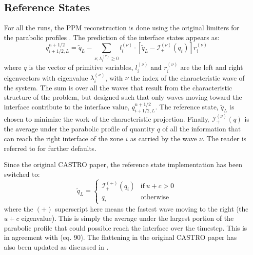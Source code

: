 \documentclass{emulateapj}
\begin{document}
\subsection{Reference States}

For all the runs, the PPM reconstruction is done using the original limiters for
the parabolic profiles \citep{ppm}.  The prediction of the interface
states appears as:
\begin{equation}
\label{eq:ppmstatel}
q_{i+1/2,L}^{n+1/2} = \tilde{q}_L -
   \sum_{\nu;\lambda_i^{(\nu)}\ge 0} l_i^{(\nu)} \cdot \left [
        \tilde{q}_L  - \mathcal{I}^{(\nu)}_+(q_i)
       \right ] r_i^{(\nu)}
\end{equation}
where $q$ is the vector of primitive variables, $l_i^{(\nu)}$ and
$r_i^{(\nu)}$ are the left and right eigenvectors with eigenvalue
$\lambda_i^{(\nu)}$, with $\nu$ the index of the characteristic wave of
the system.  The sum is over all the waves that result from the
characteristic structure of the problem, but designed such that only
waves moving toward the interface contribute to the interface value,
$q_{i+1/2,L}^{n+1/2}$.  The reference state, $\tilde{q}_L$ is
chosen to minimize the work of the characteristic projection.
Finally, $\mathcal{I}_+^{(\nu)}(q)$ is the
average under the parabolic profile of quantity $q$ of all the
information that can reach the right interface of the zone $i$ as
carried by the wave $\nu$.  The reader is referred to
\citet{ppmunsplit} for further defaults.

Since the original CASTRO paper, the reference state implementation
has been switched to:
\begin{equation}
\label{eq:refchoice}
\tilde{q}_L = \left \{ \begin{array}{cc}
       \mathcal{I}_+^{(+)}(q_i) & \mathrm{if~} u + c > 0 \\
       q_i                    & \mathrm{otherwise}
\end{array}
\right .
\end{equation}
where the $(+)$ superscript here means the fastest wave moving to the right
(the $u+c$ eigenvalue).   This is simply the average under the largest
portion of the parabolic profile that could possible reach the interface 
over the timestep.  This is
in agreement with \citet{ppmunsplit} (eq. 90).  The flattening
in the original CASTRO paper has also been updated as discussed
in \citet{zingalekatz:2015}.
\end{document}
